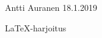 \documentclass[a4paper,12pt]{article}
\begin{document}
\noindent Antti Auranen
\hfill 18.1.2019
\vspace{20mm}
\begin{center}
\huge{LaTeX-harjoitus}
\end{center}






\nocite{*}
\printbibliography
\end{document}

